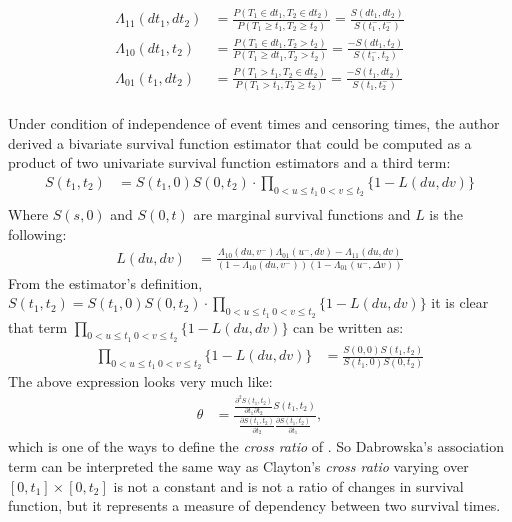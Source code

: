 \documentclass[]{article}
\begin{document}
	$$
	\begin{aligned}
		\Lambda_{11}(dt_1,dt_2) &= \frac{P(T_1 \in dt_1, T_2\in dt_2)}{P(T_1 \geq t_1, T_2 \geq t_2)} = \frac{S(dt_1, dt_2)}{S(t_1^-, t_2^-)}\\
		\Lambda_{10}(dt_1,t_2) &= \frac{P(T_1 \in dt_1, T_2 > t_2)}{P(T_1 \geq dt_1, T_2 > t_2)} = \frac{-S(dt_1, t_2)}{S(t_1^-, t_2)}\\ %
		\Lambda_{01}(t_1,dt_2) &= \frac{P(T_1 > t_1, T_2\in dt_2)}{P(T_1 > t_1, T_2 \geq t_2)} = \frac{-S(t_1, dt_2)}{S(t_1, t_2^-)}\\
	\end{aligned}
	$$


Under condition of independence of event times and censoring times, the author derived a bivariate survival function estimator that could be computed as a product of two univariate survival function estimators and a third term:
	$$
	\begin{aligned}
		{S}(t_1,t_2) &= {S}(t_1,0){S}(0,t_2)\cdot \prod_{{0<u\leq t_1~0<v\leq t_2}}\{1 - {L}(d u, d v)\}\\
	\end{aligned}
	$$
Where $S(s,0)$ and $S(0,t)$ are marginal survival functions and $L$ is the following:
	$$
	\begin{aligned}
		L(du, dv) &= \frac{{\Lambda}_{10}(d u,v^-){\Lambda}_{01}(u^-,d v) - {\Lambda}_{11}(du, dv)}{\left(1-{\Lambda}_{10}(d u,v^-)\right)\left(1-{\Lambda}_{01}(u^-,\Delta v)\right)}
	\end{aligned}
	$$
From the estimator's definition, ${S}(t_1,t_2) = {S}(t_1,0){S}(0,t_2)\cdot \prod_{{0<u\leq t_1~0<v\leq t_2}}\{1 - {L}(d u, d v)\}$ it is clear that term $\prod_{{0<u\leq t_1~0<v\leq t_2}}\{1 - {L}(d u, d v)\}$ can be written as:
	$$
	\begin{aligned}
		\prod_{{0<u\leq t_1~0<v\leq t_2}}\{1 - {L}(d u, d v)\} &=
		\frac{S(0,0)  S(t_1,t_2)}{ S(t_1,0)S(0,t_2) }
	\end{aligned}
	$$
The above expression looks very much like:
	$$
	\begin{aligned}
		\theta &= \frac{ \frac{\partial^2 S(t_1,t_2)}{\partial t_1 \partial t_2} S(t_1, t_2)}    {\frac{\partial S(t_1, t_2)}{\partial t_2} \frac{\partial S(t_1, t_2)}{\partial t_1}},
	\end{aligned}
	$$
which is one of the ways to define the \emph{cross ratio} of \cite{clayton1978model}. So Dabrowska's association term can be interpreted the same way as Clayton's \emph{cross ratio} varying over $[0, t_1]\times [0, t_2]$ is not a constant and is not a ratio of changes in survival function, but it represents a measure of dependency between two survival times.
\end{document}
